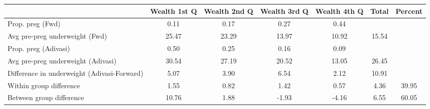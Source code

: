 \begin{tabular}{l*{6}{c}}
\toprule
            &\multicolumn{1}{c}{Wealth 1st Q}&\multicolumn{1}{c}{Wealth 2nd Q}&\multicolumn{1}{c}{Wealth 3rd Q}&\multicolumn{1}{c}{Wealth 4th Q}&\multicolumn{1}{c}{Total}&\multicolumn{1}{c}{Percent}\\
\midrule
\midrule
Prop. preg (Fwd)&        0.11&        0.17&        0.27&        0.44&            &            \\
Avg pre-preg underweight (Fwd)&       25.47&       23.29&       13.97&       10.92&       15.54&            \\
Prop. preg (Adivasi)&        0.50&        0.25&        0.16&        0.09&            &            \\
Avg pre-preg underweight (Adivasi)&       30.54&       27.19&       20.52&       13.05&       26.45&            \\
Difference in underweight (Adivasi-Forward)&        5.07&        3.90&        6.54&        2.12&       10.91&            \\
Within group difference&        1.55&        0.82&        1.42&        0.57&        4.36&       39.95\\
Between group difference&       10.76&        1.88&       -1.93&       -4.16&        6.55&       60.05\\
\bottomrule
\end{tabular}
